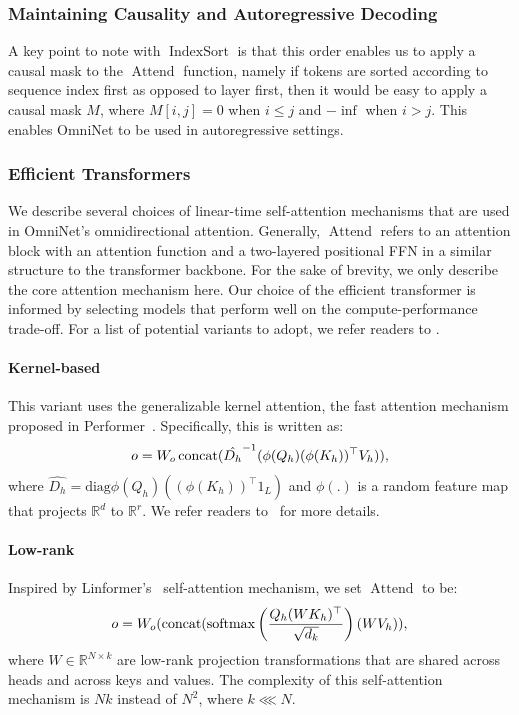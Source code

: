\documentclass{article}
\DeclareMathOperator{\softmax}{softmax}
\DeclareMathOperator{\concat}{concat}
\DeclareMathOperator{\att}{Attend}
\DeclareMathOperator{\indexsort}{IndexSort}
\begin{document}
\subsubsection{Maintaining Causality and Autoregressive Decoding}
A key point to note with $\indexsort$ is that this order enables us to apply a causal mask to the $\att$ function, namely if tokens are sorted according to sequence index first as opposed to layer first, then it would be easy to apply a causal mask $M$, where $M[i,j]=0$ when $i \leq j$ and $-\inf$ when $i>j$. This enables OmniNet to be used in autoregressive settings. 

\subsubsection{Efficient Transformers}
We describe several choices of linear-time self-attention mechanisms that are used in OmniNet's omnidirectional attention. Generally, $\att$ refers to an attention block with an attention function and a two-layered positional FFN in a similar structure to the transformer backbone. For the sake of brevity, we only describe the core attention mechanism here. Our choice of the efficient transformer is informed by \citep{tay2020long} selecting models that perform well on the compute-performance trade-off. For a list of potential variants to adopt, we refer readers to \citep{tay2020efficient}.
\vspace{-5pt}
\paragraph{Kernel-based} This variant uses the generalizable kernel attention, the fast attention mechanism proposed in Performer~\citep{choromanski2020rethinking}. Specifically, this is written as:
\begin{align*}
\vspace{-5pt}
o = W_o\concat(\hat{D_h}^{-1}(\phi(Q_h)(\phi(K_h))^\top V_h)),
\vspace{-5pt}
\end{align*}
where $\hat{D_h} = \text{diag}\phi(Q_h)((\phi(K_h))^\top 1_{L})$ and $\phi(.)$ is a random feature map that projects $\mathbb{R}^{d}$ to $\mathbb{R}^{r}$. We refer readers to~\citep{choromanski2020rethinking} for more details.
\vspace{-5pt}
\paragraph{Low-rank} Inspired by Linformer's~\citep{wang2020linformer} self-attention mechanism, we set $\att$ to be:
\begin{align*} 
\vspace{-5pt}
o = W_{o}(\concat(\softmax\left(\frac{Q_h(WK_h)^{\top}}{\sqrt{d_{k}}}\right)(WV_h)),
\vspace{-5pt}
\end{align*}
where $W \in \mathbb{R}^{N \times k}$ are low-rank projection transformations that are shared across heads and across keys and values. The complexity of this self-attention mechanism is $Nk$ instead of $N^2$, where $k \lll N$.
\vspace{-5pt}
\end{document}
